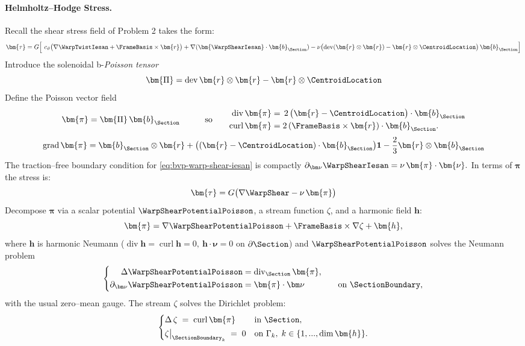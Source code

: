 
\paragraph{Helmholtz–Hodge Stress.}
Recall the shear stress field of Problem 2 takes the form:
\[
\bm{\tau}=G\Big[\ c_{\vartheta}\big(\nabla \WarpTwistIesan+\FrameBasis\times\bm{r}\big)
+\nabla (\bm{\WarpShearIesan}\cdot\bm{b}_{\Section})
-\nu\bigl(\operatorname{dev}(\bm{r}\otimes\bm{r})-\bm{r}\otimes\CentroidLocation \bigr)\,\bm{b}_{\Section}
\Big] \\
\]
Introduce the solenoidal b-\emph{Poisson tensor}
\[
\bm{\Pi} = \operatorname{dev}\bm{r}\otimes\bm{r} - \bm{r}\otimes\CentroidLocation
\]
Define the Poisson vector field
\[
\begin{aligned}
\bm{\pi}
&=\bm{\Pi}\,\bm{b}_{\Section}
\end{aligned}
\qquad\text{so}\qquad
\begin{aligned}
\operatorname{div} \bm{\pi} &= \,2\,\big(\bm{r}-\CentroidLocation\big) \cdot \bm{b}_{\Section} \\
\operatorname{curl}\bm{\pi}
&= 2\,(\FrameBasis\times\bm{r})\cdot\bm{b}_{\Section}.
\end{aligned}
\]
$$
\operatorname{grad} \bm{\pi} = \bm{b}_{\Section} \otimes \bm{r} + \big( (\bm{r} - \CentroidLocation) \cdot \bm{b}_{\Section} \big) \mathbf{1} - \frac{2}{3} \bm{r}\otimes \bm{b}_{\Section}
$$
%
The traction–free boundary condition for \eqref{eq:bvp-warp-shear-iesan} is compactly
\(
\partial_{\bm\nu}\WarpShearIesan = \nu\,\bm{\pi}\cdot\bm{\nu}.
\)
%
In terms of \(\bm{\pi}\) the stress is:
\[
\bm{\tau}=G\big(\nabla\WarpShear-\nu\,\bm{\pi}\big)
\]
Decompose \(\bm{\pi}\) via a scalar potential \(\WarpShearPotentialPoisson\), a stream function \(\zeta\), and a harmonic field \(\bm{h}\):
\[
\bm{\pi}=\nabla\WarpShearPotentialPoisson + \FrameBasis\times\nabla\zeta + \bm{h},
\]
where \(\bm{h}\) is harmonic Neumann (\(\operatorname{div}\bm{h}=\operatorname{curl}\bm{h}=0,\ \bm{h}\cdot\bm\nu=0\) on \(\partial\Section\)) and \(\WarpShearPotentialPoisson\) solves the Neumann problem
\[
\left\{
\begin{aligned}
\Delta\WarpShearPotentialPoisson&=\operatorname{div}_{\Section}\bm{\pi} , %
\\
\partial_{\bm\nu}\WarpShearPotentialPoisson&=\bm{\pi}\cdot\bm\nu
&\quad\text{on } \SectionBoundary,
\end{aligned}
\right.
\]
with the usual zero–mean gauge. The stream \(\zeta\) solves the Dirichlet problem:
\[
\begin{cases}
\Delta \,\zeta \;=\; \operatorname{curl}\bm{\pi} & \text{in }\Section,\\[2pt]
\zeta\big|_{\SectionBoundary_k} \;=\; 0 & \text{on }\Gamma_k,\;k\in \{1,...,\dim\bm{h}\}.
\end{cases}
\]

